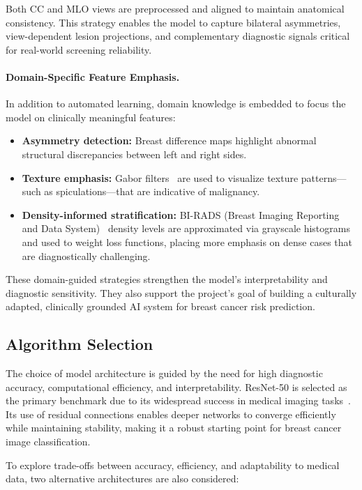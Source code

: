 \documentclass[12pt]{article}
\begin{document}
Both CC and MLO views are preprocessed and aligned to maintain anatomical consistency. This strategy enables the model to capture bilateral asymmetries, view-dependent lesion projections, and complementary diagnostic signals critical for real-world screening reliability.

\paragraph{Domain-Specific Feature Emphasis.}
In addition to automated learning, domain knowledge is embedded to focus the model on clinically meaningful features:

\begin{itemize}
    \item \textbf{Asymmetry detection:} Breast difference maps highlight abnormal structural discrepancies between left and right sides.
    \item \textbf{Texture emphasis:} Gabor filters~\cite{20} are used to visualize texture patterns—such as spiculations—that are indicative of malignancy.
    \item \textbf{Density-informed stratification:} BI-RADS (Breast Imaging Reporting and Data System)~\cite{16} density levels are approximated via grayscale histograms and used to weight loss functions, placing more emphasis on dense cases that are diagnostically challenging.
\end{itemize}

These domain-guided strategies strengthen the model’s interpretability and diagnostic sensitivity. They also support the project’s goal of building a culturally adapted, clinically grounded AI system for breast cancer risk prediction.

\subsection{Algorithm Selection}

The choice of model architecture is guided by the need for high diagnostic accuracy, computational efficiency, and interpretability. ResNet-50 is selected as the primary benchmark due to its widespread success in medical imaging tasks~\cite{1,7}. Its use of residual connections enables deeper networks to converge efficiently while maintaining stability, making it a robust starting point for breast cancer image classification.

To explore trade-offs between accuracy, efficiency, and adaptability to medical data, two alternative architectures are also considered:
\end{document}
